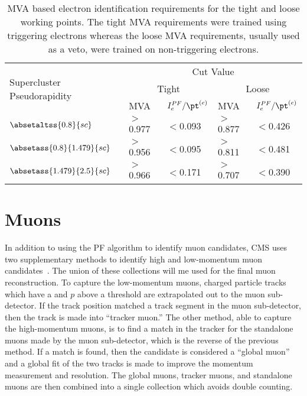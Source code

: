 \begin{table}[htbp]
    \caption{MVA based electron identification requirements for the tight and loose working points. The tight MVA requirements were trained using triggering electrons whereas the loose MVA requirements, usually used as a veto, were trained on non-triggering electrons.}
    \centering
    \begin{tabular}{lllll}
        \hline
        \multirow{3}{*}{Supercluster Pseudorapidity} & \multicolumn{4}{c}{Cut Value} \\\cline{2-5}
                                        & \multicolumn{2}{c}{Tight}         & \multicolumn{2}{c}{Loose} \\\cline{2-5}
                                        & MVA      & $I_{e}^{PF}/\pt^{(e)}$ & MVA      & $I_{e}^{PF}/\pt^{(e)}$ \\
        \hline
        $\absetaltss{0.8}{sc}$          & $>$0.977 & $<$0.093               & $>$0.877 & $<$0.426 \\
        $\absetass{0.8}{1.479}{sc}$     & $>$0.956 & $<$0.095               & $>$0.811 & $<$0.481 \\
        $\absetass{1.479}{2.5}{sc}$     & $>$0.966 & $<$0.171               & $>$0.707 & $<$0.390 \\
        \hline
    \end{tabular}
    \label{tab:electron_id_mva}
\end{table}

\section{Muons}

In addition to using the PF algorithm to identify muon candidates, CMS uses two supplementary methods to identify high and low-momentum muon candidates~\cite{CMS-PAS-MUO-10-002}. The union of these collections will me used for the final muon reconstruction. To capture the low-momentum muons, charged particle tracks which have a \pt and $p$ above a threshold are extrapolated out to the muon sub-detector. If the track position matched a track segment in the muon sub-detector, then the track is made into ``tracker muon.'' The other method, able to capture the high-momentum muons, is to find a match in the tracker for the standalone muons made by the muon sub-detector, which is the reverse of the previous method. If a match is found, then the candidate is considered a ``global muon'' and a global fit of the two tracks is made to improve the momentum measurement and resolution. The global muons, tracker muons, and standalone muons are then combined into a single collection which avoids double counting.

